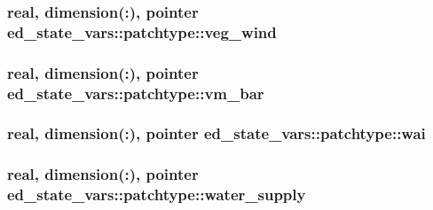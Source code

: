\subsubsection[{\texorpdfstring{veg\+\_\+wind}{veg_wind}}]{\setlength{\rightskip}{0pt plus 5cm}real, dimension(\+:), pointer ed\+\_\+state\+\_\+vars\+::patchtype\+::veg\+\_\+wind}\hypertarget{structed__state__vars_1_1patchtype_ace41cbe840582a55a0300bebc961e5c6}{}\label{structed__state__vars_1_1patchtype_ace41cbe840582a55a0300bebc961e5c6}
\subsubsection[{\texorpdfstring{vm\+\_\+bar}{vm_bar}}]{\setlength{\rightskip}{0pt plus 5cm}real, dimension(\+:), pointer ed\+\_\+state\+\_\+vars\+::patchtype\+::vm\+\_\+bar}\hypertarget{structed__state__vars_1_1patchtype_a37e219f6314282cae321f40d5637204a}{}\label{structed__state__vars_1_1patchtype_a37e219f6314282cae321f40d5637204a}
\subsubsection[{\texorpdfstring{wai}{wai}}]{\setlength{\rightskip}{0pt plus 5cm}real, dimension(\+:), pointer ed\+\_\+state\+\_\+vars\+::patchtype\+::wai}\hypertarget{structed__state__vars_1_1patchtype_aad0098c6e7705362a895f5b8666b23e5}{}\label{structed__state__vars_1_1patchtype_aad0098c6e7705362a895f5b8666b23e5}
\subsubsection[{\texorpdfstring{water\+\_\+supply}{water_supply}}]{\setlength{\rightskip}{0pt plus 5cm}real, dimension(\+:), pointer ed\+\_\+state\+\_\+vars\+::patchtype\+::water\+\_\+supply}\hypertarget{structed__state__vars_1_1patchtype_abb4ee95bd7a2926413df50595faff1a9}{}\label{structed__state__vars_1_1patchtype_abb4ee95bd7a2926413df50595faff1a9}

